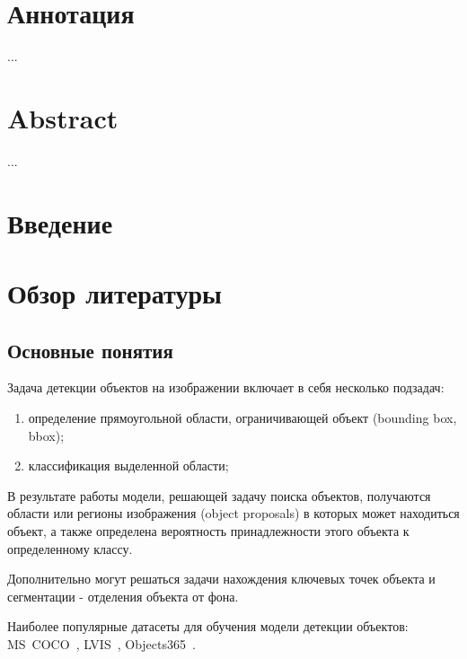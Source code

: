 \documentclass[a4paper,14pt]{article}
\begin{document}
	

    \section*{\normalsize \hfill Аннотация \hfill}

    ...

    \sloppy
    \newpage

    \section*{\normalsize \hfill Abstract \hfill}

    ...

    \newpage

    \tableofcontents
    \pagebreak

    \section*{Введение}


    \newpage


    \section{Обзор литературы}
    
    \subsection{Основные понятия}
    
    Задача детекции объектов на изображении включает в себя несколько подзадач:
    \begin{enumerate}
    	[1)]
    	\itemsep0em
    	\item определение прямоугольной области, ограничивающей объект (bounding box, bbox); 
    	\item классификация выделенной области; 
    \end{enumerate}
	В результате работы модели, решающей задачу поиска объектов, получаются области или регионы изображения (object proposals) в которых может находиться объект, а также определена вероятность принадлежности этого объекта к определенному классу.
	
	Дополнительно могут решаться задачи нахождения ключевых точек объекта и сегментации - отделения объекта от фона.
	
	Наиболее популярные датасеты для обучения модели детекции объектов: MS~COCO~\cite{COCO}, LVIS~\cite{LVIS}, Objects365~\cite{Objects365}.
	
\end{document}
